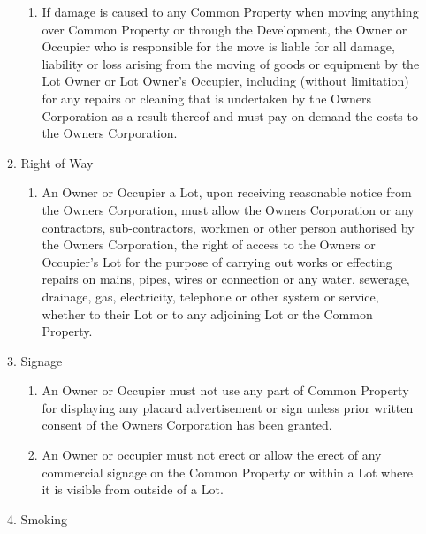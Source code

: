 \documentclass{article}
\begin{document}
\begin{enumerate}[label=\arabic*.]
\begin{enumerate}[label=\arabic{enumi}.\arabic*.]
\begin{enumerate}[label=(\arabic*)]
\item  If damage is caused to any Common Property when moving anything over Common Property or through the Development, the Owner or Occupier who is responsible for the move is liable for all damage, liability or loss arising from the moving of goods or equipment by the Lot Owner or Lot Owner’s Occupier, including (without limitation) for any repairs or cleaning that is undertaken by the Owners Corporation as a result thereof and must pay on demand the costs to the Owners Corporation.
\newpage



\end{enumerate}

\item  Right of Way

\begin{enumerate}[label=(\arabic*)]

\item  An Owner or Occupier a Lot, upon receiving reasonable notice from the Owners Corporation, must allow the Owners Corporation or any contractors, sub-contractors, workmen or other person authorised by the Owners Corporation, the right of access to the Owners or Occupier’s Lot for the purpose of carrying out works or effecting repairs on mains, pipes, wires or connection or any water, sewerage, drainage, gas, electricity, telephone or other system or service, whether to their Lot or to any adjoining Lot or the Common Property.

\end{enumerate}

\item  Signage

\begin{enumerate}[label=(\arabic*)]

\item  An Owner or Occupier must not use any part of Common Property for displaying any placard advertisement or sign unless prior written consent of the Owners Corporation has been granted.

\item  An Owner or occupier must not erect or allow the erect of any commercial signage on the Common Property or within a Lot where it is visible from outside of a Lot.

\end{enumerate}

\item  Smoking

\begin{enumerate}[label=(\arabic*)]


\end{enumerate}
\end{enumerate}
\end{enumerate}
\end{document}
